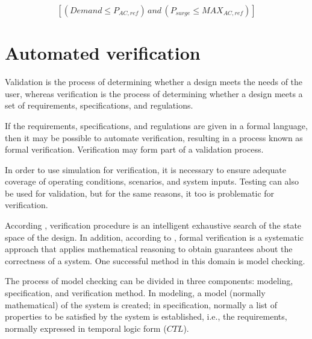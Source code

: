\documentclass[journal]{IEEEtran}
\begin{document}
\begin{equation}
\label{eq:invcheck} 
\left[ (Demand \leq P_{AC,ref}) \, and \, (P_{surge} \leq MAX_{AC,ref}) \right] 
\end{equation}

\section{Automated verification}
Validation is the process of determining whether a design meets the needs of the user, whereas verification is the process of determining whether a design meets a set of requirements, specifications, and regulations.  

If the requirements, specifications, and regulations are given in a formal language, then it may be possible to automate verification, resulting in a process known as formal verification. Verification may form part of a validation process.

In order to use simulation for verification, it is necessary to ensure adequate coverage of operating conditions, scenarios, and system inputs. Testing can also be used for validation, but for the same reasons, it too is problematic for verification.
 
According \cite{Clarke2008}, verification procedure is an intelligent exhaustive search of the state space of the design. In addition, according to \cite{Forejt2011}, formal verification is a systematic approach that applies mathematical reasoning to obtain guarantees about the correctness of a system. One successful method in this domain is model checking.

The process of model checking can be divided in three components: modeling, specification, and verification method. In modeling, a model (normally mathematical) of the system is created; in specification, normally a list of properties to be satisfied by the system is established, i.e., the requirements, normally  expressed in temporal logic form ($CTL$).

\end{document}
